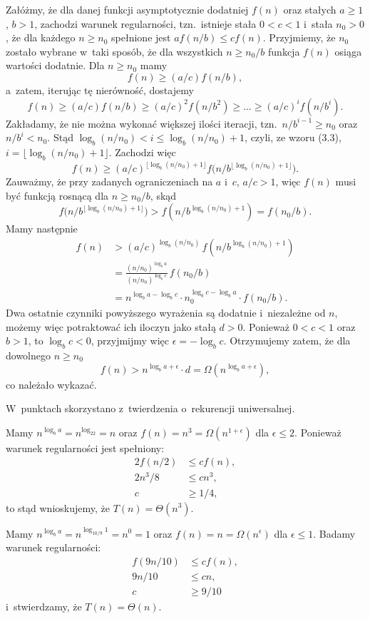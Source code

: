 \noindent Załóżmy, że dla danej funkcji asymptotycznie dodatniej $f(n)$ oraz stałych $a\ge1$, $b>1$, zachodzi warunek regularności, tzn.\ istnieje stała $0<c<1$ i~stała $n_0>0$, że dla każdego $n\ge n_0$ spełnione jest $af(n/b)\le cf(n)$.
Przyjmiemy, że $n_0$ zostało wybrane w~taki sposób, że dla wszystkich $n\ge n_0/b$ funkcja $f(n)$ osiąga wartości dodatnie.
Dla $n\ge n_0$ mamy
\[
	f(n) \ge (a/c)f(n/b),
\]
a~zatem, iterując tę nierówność, dostajemy
\[
	f(n) \ge (a/c)f(n/b) \ge (a/c)^2f(n/b^2) \ge \dots \ge (a/c)^if(n/b^i).
\]
Zakładamy, że nie można wykonać większej ilości iteracji, tzn.\ $n/b^{i-1}\ge n_0$ oraz $n/b^i<n_0$.
Stąd $\log_b(n/n_0)<i\le\log_b(n/n_0)+1$, czyli, ze wzoru (3.3), $i=\lfloor\log_b(n/n_0)+1\rfloor$.
Zachodzi więc
\[
	f(n) \ge (a/c)^{\lfloor\log_b(n/n_0)+1\rfloor}f\bigl(n/b^{\lfloor\log_b(n/n_0)+1\rfloor}\bigr).
\]
Zauważmy, że przy zadanych ograniczeniach na $a$ i~$c$, $a/c>1$, więc $f(n)$ musi być funkcją rosnącą dla $n\ge n_0/b$, skąd
\[
	f\bigl(n/b^{\lfloor\log_b(n/n_0)+1\rfloor}\bigr) > f(n/b^{\log_b(n/n_0)+1}) = f(n_0/b).
\]
Mamy następnie
\begin{align*}
	f(n) &> (a/c)^{\log_b(n/n_0)}\,f(n/b^{\log_b(n/n_0)+1}) \\[1mm]
	&= \frac{(n/n_0)^{\log_ba}}{(n/n_0)^{\log_bc}}\,f(n_0/b) \\[1mm]
	&= n^{\log_ba-\log_bc}\cdot n_0^{\log_bc-\log_ba}\cdot f(n_0/b).
\end{align*}
Dwa ostatnie czynniki powyższego wyrażenia są dodatnie i~niezależne od $n$, możemy więc potraktować ich iloczyn jako stałą $d>0$.
Ponieważ $0<c<1$ oraz $b>1$, to $\log_bc<0$, przyjmijmy więc $\epsilon=-\log_bc$.
Otrzymujemy zatem, że dla dowolnego $n\ge n_0$
\[
	f(n) > n^{\log_ba+\epsilon}\cdot d = \Omega(n^{\log_ba+\epsilon}),
\]
co należało wykazać.

\problems

W~punktach  skorzystano z~twierdzenia o~rekurencji uniwersalnej.

\subproblem %
Mamy $n^{\log_ba}=n^{\log_22}=n$ oraz $f(n)=n^3=\Omega(n^{1+\epsilon})$ dla $\epsilon\le2$.
Ponieważ warunek regularności jest spełniony:
\begin{align*}
	2f(n/2) &\le cf(n), \\
	2n^3\!/8 &\le cn^3, \\
	c &\ge 1/4,
\end{align*}
to stąd wnioskujemy, że $T(n)=\Theta(n^3)$.

\subproblem %
Mamy $n^{\log_ba}=n^{\log_{10/9}1}=n^0=1$ oraz $f(n)=n=\Omega(n^\epsilon)$ dla $\epsilon\le1$.
Badamy warunek regularności:
\begin{align*}
	f(9n/10) &\le cf(n), \\
	9n/10 &\le cn, \\
	c &\ge 9/10
\end{align*}
i~stwierdzamy, że $T(n)=\Theta(n)$.

